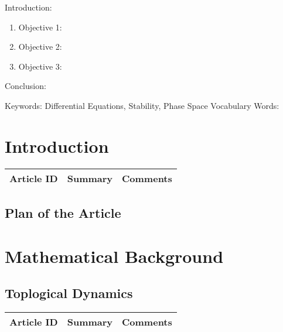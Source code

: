 

\twocolumn
\scriptsize
\begin{frontmatter}
		\title{}
		\author{}
		\address{The Mathematical Learning Space}
\end{frontmatter}	

Introduction:
\begin{enumerate}
\item Objective 1:
\item Objective 2:
\item Objective 3:
\end{enumerate}
Conclusion:

Keywords: Differential Equations, Stability, Phase Space
Vocabulary Words:

\section{Introduction}

\begin{table}[H]\centering
	\begin{tabular}{p{1cm}p{4cm}p{3cm}}
		Article ID & Summary & Comments\\
		\hline
		\hline
	\end{tabular}
\end{table}

\subsection{Plan of the Article}

\begin{enumerate}
\end{enumerate}

\section{Mathematical Background}


\subsection{Toplogical Dynamics}

\begin{table}[H]\centering
	\begin{tabular}{p{1cm}p{4cm}p{3cm}}
		Article ID & Summary & Comments\\
		\hline
		\hline
	\end{tabular}
\end{table}

